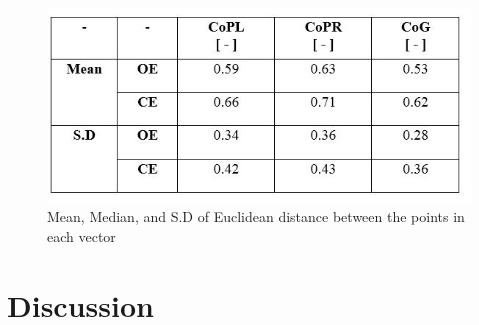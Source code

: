 \documentclass[twoside]{ctuthesis}
\theoremstyle{plain}
\theoremstyle{definition}
\theoremstyle{note}
\begin{document}
\begin{figure}[H]
	\centering
	\includegraphics[width = .8\textwidth]{Patient5DistTable}
	\begin{table}[H]
		\caption{Mean, Median, and S.D of Euclidean distance between the points in each vector}
	\end{table}
\end{figure}


\pagebreak

\begingroup
\renewcommand{\cleardoublepage}{}
\renewcommand{\clearpage}{}
\chapter{Discussion}
\endgroup
\end{document}
